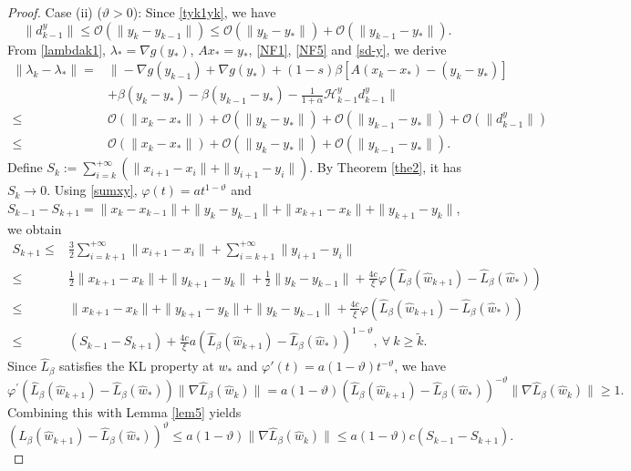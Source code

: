 \documentclass[pdflatex,sn-mathphys-num]{sn-jnl}%
\theoremstyle{thmstyleone}%
\theoremstyle{thmstyletwo}%
\theoremstyle{thmstylethree}%
\begin{document}
\begin{proof}
Case (ii) ($\vartheta > 0$): 
Since \eqref{tyk1yk}, we have
\[
\|d_{k-1}^y\|\leq \mathcal{O}(\|y_{k}-y_{k-1}\|)\leq\mathcal{O}(\|y_{k}-y_{*}\|)+\mathcal{O}(\|y_{k-1}-y_{*}\|).
\]
From \eqref{lambdak1}, $\lambda_*=\nabla g(y_*)$, $Ax_*=y_*$, \eqref{NF1}, \eqref{NF5} and \eqref{sd-y}, we derive
\begin{align}
\|\lambda_{k}-\lambda_{*}\|= &\|-\nabla g (y_{k-1})+\nabla g (y_{*})+(1-s)\beta [A( x_{k}-x_{*})-(y_{k}-y_{*})]\nonumber\\
&+\beta(y_{k}-y_*)-\beta(y_{k-1}-y_{*})-\frac{1}{1+\alpha}\mathcal{H}_{k-1}^y d_{k-1}^y\|\nonumber\\ 
\leq &\mathcal{O}(\|{x}_{k}-x_{*}\|)+\mathcal{O}(\|{y}_{k}-y_{*}\|)+\mathcal{O}(\|{y}_{k-1}-y_{*}\|)+\mathcal{O}(\|d_{k-1}^y\|)\nonumber\\
\leq & \mathcal{O}(\|{x}_{k}-x_{*}\|)+\mathcal{O}(\|{y}_{k}-y_{*}\|)+\mathcal{O}(\|{y}_{k-1}-y_{*}\|). \label{*4.3N}
\end{align}
Define $S_{k}:=\sum_{i=k}^{+\infty} (\|{x}_{i+1}-x_{i}\|+\|{y}_{i+1}-y_{i}\|)$. By Theorem \ref{the2}, it has $S_{k}\to 0$. Using \eqref{sumxy}, $\varphi(t)=at^{1-\vartheta}$ and $S_{k-1}-S_{k+1}=\|{x}_{k}-x_{k-1}\|+\|{y}_{k}-y_{k-1}\|+\|{x}_{k+1}-x_{k}\|+\|{y}_{k+1}-y_{k}\|$, we obtain
\begin{align}
S_{{k}+1}\leq& \frac{3}{2}\sum_{i=k+1}^{+\infty}\|{x}_{i+1}-x_{i}\|+\sum_{i=k+1}^{+\infty}\|{y}_{i+1}-y_{i}\|\nonumber\\
\leq& \frac{1}{2}\|{x}_{k+1}-x_{k}\|+\|{y}_{k+1}-y_{k}\|+\frac{1}{2}\|{y}_{k}-y_{k-1}\|+\frac{4c}{\xi}\varphi(\hat{L}_{\beta}(\hat{w}_{k+1})-\hat{L}_{\beta}(\hat{w}_{*}))\nonumber\\
\leq& \|{x}_{k+1}-x_{k}\|+\|{y}_{k+1}-y_{k}\|+\|{y}_{k}-y_{k-1}\|+\frac{4c}{\xi}\varphi(\hat{L}_{\beta}(\hat{w}_{k+1})-\hat{L}_{\beta}(\hat{w}_{*}))\nonumber\\
\leq& (S_{k-1}-S_{k+1}) +\frac{4c}{\xi}a(\hat{L}_{\beta}(\hat{w}_{{k}+1})-\hat{L}_{\beta}(\hat{w}_{*}))^{1-\vartheta},~\forall~k\geq \tilde{k}.\label{4.200N}
\end{align}
Since $\hat{L}_{\beta}$ satisfies the KL property at $w_{*}$ and $\varphi'(t)=a(1-\vartheta)t^{-\vartheta}$, we have 
\[
\varphi^{'}(\hat{L}_{\beta}(\hat{w}_{{k}+1})-\hat{L}_{\beta}(\hat{w}_*)) \|\nabla\hat{L}_{\beta}(\hat{w}_{k})\|
= a(1-\vartheta)(\hat{L}_{\beta}(\hat{w}_{{k}+1})-\hat{L}_{\beta}(\hat{w}_*))^{-\vartheta}\|\nabla\hat{L}_{\beta}(\hat{w}_{k})\| \geq 1.
\]
Combining this with Lemma \ref{lem5} yields
\[(\hat{L}_{\beta}(\hat{w}_{{k}+1})-\hat{L}_{\beta}(\hat{w}_*))^{\vartheta} \leq a(1-\vartheta)\|\nabla\hat{L}_{\beta}(\hat{w}_{k})\|\leq a(1-\vartheta)c(S_{k-1}-S_{k+1}).\]

\end{proof}
\end{document}
